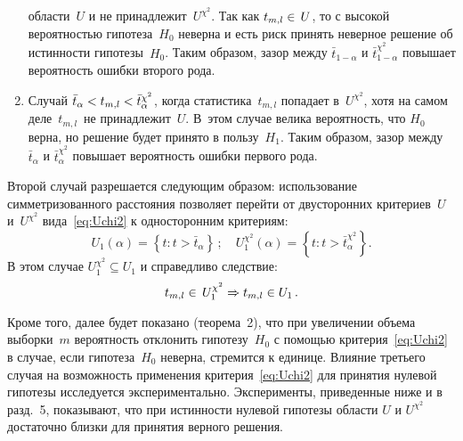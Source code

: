 \begin{multicols}{2}
\begin{enumerate}
 области~$U$ и не принадлежит~$U^{\chi^2}$. Так как $t_{m,l}\hm\in\,U$,
 то с высокой вероятностью гипотеза~$H_0$ неверна и есть риск принять
 неверное решение об истинности гипотезы~$H_0$. Таким образом, зазор
 между $\bar{t}_{1-\alpha}$ и $\bar{t}_{1-\alpha}^{\chi^2}$ повышает вероятность
 ошибки второго рода.
  \item Случай $\bar{t}_{\alpha} \hm< t_{m,l} \hm< \bar{t}_{\alpha}^{\chi^2}$,
  когда статистика~$t_{m,l}$ попадает в~$U^{\chi^2}$, хотя на самом деле~$t_{m,l}$~не
  принадлежит~$U$. В~этом случае велика вероятность, что $H_0$ верна, но
  решение будет принято в пользу~$H_1$. Таким образом, зазор между
  $\bar{t}_{\alpha}$ и $\bar{t}_{\alpha}^{\chi^2}$ повышает вероятность
  ошибки первого рода.
 \end{enumerate}

 Второй случай разрешается следующим образом: использование симметризованного
 рас\-сто\-яния позволяет перейти от двусторонних критериев~$U$ и~$U^{\chi^2}$
 вида~\eqref{eq:Uchi2} к односторонним критериям:
  $$
  U_1(\alpha) = \left\{t: t > \bar{t}_{\alpha}\right\}\,;\quad
  U_1^{\chi^2}(\alpha) = \left\{t: t > \bar{t}^{\chi^2}_{\alpha}\right\}.
  $$
  В этом случае $U_1^{\chi^2}\subseteq U_1$ и справедливо следствие:
$$
t_{m,l}\hm\in\,U_1^{\chi^2}\hm\Rightarrow t_{m,l}\hm \in U_1\,.
$$

  Кроме того, далее будет показано (теорема~2), что при увеличении объема
  выборки~$m$ вероятность отклонить гипотезу~$H_0$ с помощью
  критерия~\eqref{eq:Uchi2} в случае, если гипотеза~$H_0$ неверна, стремится
  к единице.
  Влияние третьего случая на возможность применения критерия~\eqref{eq:Uchi2}
  для принятия нулевой гипотезы исследуется экспериментально. Эксперименты,
  приведенные ниже и в разд.~5, показывают, что при истинности нулевой гипотезы области $U$ и $U^{\chi^2}$ достаточно близки для принятия верного решения.

  \begin{figure*} %
\vspace*{1pt}
\begin{center}
\mbox{%
\epsfxsize=164.559mm
}
\end{center}
\vspace*{-9pt}
\label{fg:norm}
\end{figure*}


\end{multicols}
